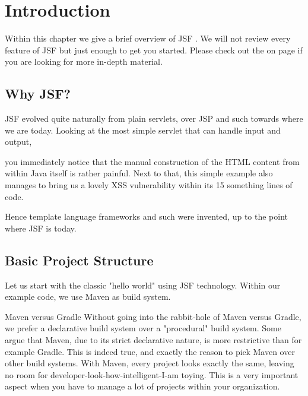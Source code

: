 %

\chapter{Introduction}

Within this chapter we give a brief overview of JSF \cite{JSF23}.
We will not review every feature of JSF but just enough to get you started.
Please check out the  on page \pageref{chap:references} if you are looking for more in-depth material.

\section{Why JSF?}
JSF evolved quite naturally from plain servlets, over JSP and such towards where we are today.
Looking at the most simple servlet that can handle input and output,

you immediately notice that the manual construction of the HTML content from within Java itself is rather painful.
Next to that, this simple example also manages to bring us a lovely XSS vulnerability within its 15 something lines of code.

Hence template language frameworks and such were invented, up to the point where JSF is today.


\section{Basic Project Structure}
Let us start with the classic "hello world" using JSF technology.
Within our example code, we use Maven as build system.

\begin{ClownComputing}{Maven versus Gradle}
	Without going into the rabbit-hole of Maven versus Gradle, we prefer a declarative build system over a "procedural" build system.
	Some argue that Maven, due to its strict declarative nature, is more restrictive than for example Gradle.
	This is indeed true, and exactly the reason to pick Maven over other build systems.
	With Maven, every project looks exactly the same, leaving no room for developer-look-how-intelligent-I-am toying.
	This is a very important aspect when you have to manage a lot of projects within your organization.
\end{ClownComputing}

